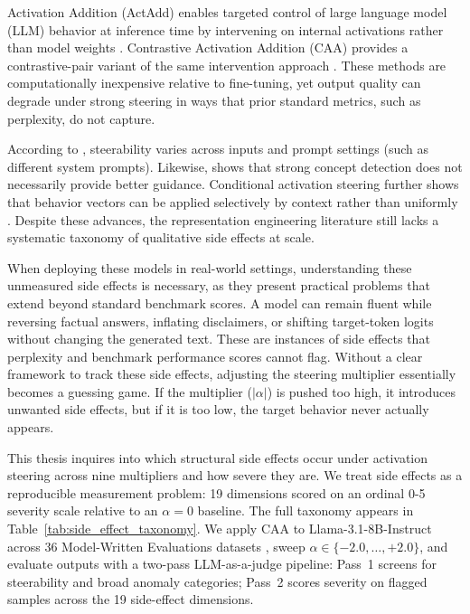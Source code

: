 Activation Addition (ActAdd) enables targeted control of large language model (LLM) behavior at inference time by intervening on internal activations rather than model weights \citep{turnerSteeringLanguageModels2023}.
Contrastive Activation Addition (CAA) provides a contrastive-pair variant of the same intervention approach \citep{rimskySteeringLlama22024}.
These methods are computationally inexpensive relative to fine-tuning, yet output quality can degrade under strong steering in ways that prior standard metrics, such as perplexity, do not capture.

According to \cite{tanAnalysingGeneralisationReliability2024}, steerability varies across inputs and prompt settings (such as different system prompts).
Likewise, \cite{vonrutteLanguageModelsGuide2024} shows that strong concept detection does not necessarily provide better guidance.
Conditional activation steering further shows that behavior vectors can be applied selectively by context rather than uniformly \citep{leeProgrammingRefusalConditional2025}.
Despite these advances, the representation engineering literature still lacks a systematic taxonomy of qualitative side effects at scale.

When deploying these models in real-world settings, understanding these unmeasured side effects is necessary, as they present practical problems that extend beyond standard benchmark scores.
A model can remain fluent while reversing factual answers, inflating disclaimers, or shifting target-token logits without changing the generated text. These are instances of side effects that perplexity and benchmark performance scores cannot flag.
Without a clear framework to track these side effects, adjusting the steering multiplier essentially becomes a guessing game. If the multiplier ($|\alpha|$) is pushed too high, it introduces unwanted side effects, but if it is too low, the target behavior never actually appears.

This thesis inquires into which structural side effects occur under activation steering across nine multipliers and how severe they are.
We treat side effects as a reproducible measurement problem: 19 dimensions scored on an ordinal 0-5 severity scale relative to an $\alpha{=}0$ baseline.
The full taxonomy appears in Table~\ref{tab:side_effect_taxonomy}.
We apply CAA to Llama-3.1-8B-Instruct across 36 Model-Written Evaluations datasets \citep{perezDiscoveringLanguageModel2022}, sweep $\alpha \in \{-2.0,\ldots,+2.0\}$, and evaluate outputs with a two-pass LLM-as-a-judge pipeline: Pass~1 screens for steerability and broad anomaly categories; Pass~2 scores severity on flagged samples across the 19 side-effect dimensions.

